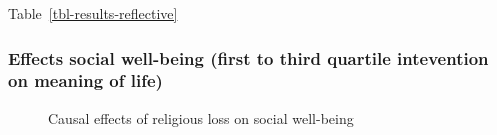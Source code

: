 \documentclass[
  singlecolumn,
  9pt]{scrartcl}
\begin{document}
Table~\ref{tbl-results-reflective}

\subsubsection{Effects social well-being (first to third quartile
intevention on meaning of
life)}\label{effects-social-well-being-first-to-third-quartile-intevention-on-meaning-of-life}

\begin{figure}


\caption{\label{fig-results-social-wellbeing}Causal effects of religious
loss on social well-being}

\end{figure}%
\end{document}

